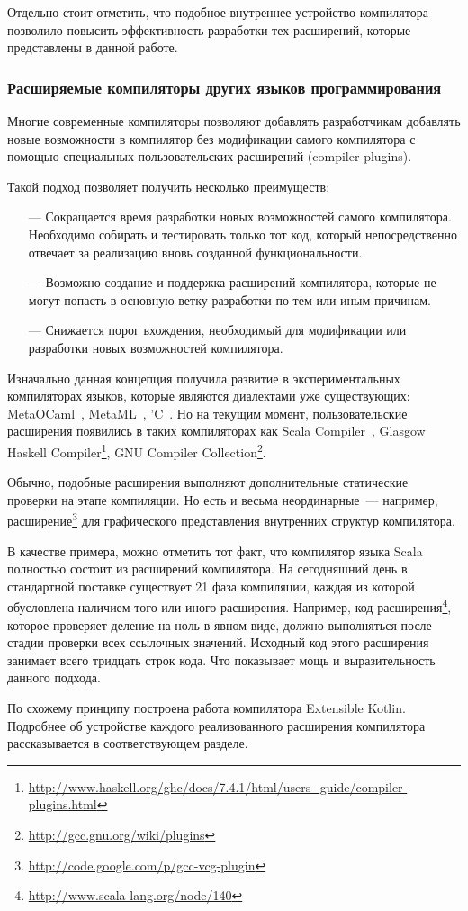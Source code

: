 Отдельно стоит отметить, что подобное внутреннее устройство компилятора позволило повысить эффективность разработки тех расширений, которые представлены в данной работе.

\subsubsection{Расширяемые компиляторы других языков программирования}
Многие современные компиляторы позволяют добавлять разработчикам добавлять новые возможности в компилятор без модификации самого компилятора с помощью специальных пользовательских расширений (compiler plugins).

Такой подход позволяет получить несколько преимуществ:
\begin{itemize}
\item[---] Сокращается время разработки новых возможностей самого компилятора. Необходимо собирать и тестировать только тот код, который непосредственно отвечает за реализацию вновь созданной функциональности.
\item[---] Возможно создание и поддержка расширений компилятора, которые не могут попасть в основную ветку разработки по тем или иным причинам.
\item[---] Снижается порог вхождения, необходимый для модификации или разработки новых возможностей компилятора.
\end{itemize}

Изначально данная концепция получила развитие в экспериментальных компиляторах языков, которые являются диалектами уже существующих: MetaOCaml~\cite{metaocaml}, MetaML~\cite{metaml}, 'C~\cite{extendible-c}.
Но на текущим момент, пользовательские расширения появились в таких компиляторах как
Scala Compiler~\cite{scala-spec},
Glasgow Haskell Compiler\footnote{\url{http://www.haskell.org/ghc/docs/7.4.1/html/users_guide/compiler-plugins.html}}, GNU Compiler Collection\footnote{\url{http://gcc.gnu.org/wiki/plugins}}.

Обычно, подобные расширения выполняют дополнительные статические проверки на этапе компиляции. Но есть и весьма неординарные~--- например, расширение\footnote{\url{http://code.google.com/p/gcc-vcg-plugin}} для графического представления внутренних структур компилятора.

В качестве примера, можно отметить тот факт, что компилятор языка Scala полностью состоит из расширений компилятора. На сегодняшний день в стандартной поставке существует 21 фаза компиляции, каждая из которой обусловлена наличием того или иного расширения. Например, код расширения\footnote{\url{http://www.scala-lang.org/node/140}}, которое проверяет деление на ноль в явном виде, должно выполняться после стадии проверки всех ссылочных значений. Исходный код этого расширения занимает всего тридцать строк кода. Что показывает мощь и выразительность данного подхода.

По схожему принципу построена работа компилятора Extensible Kotlin. Подробнее об устройстве каждого реализованного расширения компилятора рассказывается в соответствующем разделе.
